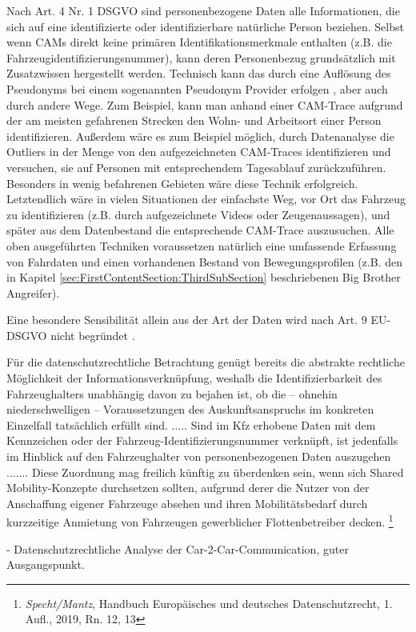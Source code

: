 Nach Art. 4 Nr. 1 DSGVO sind personenbezogene Daten alle Informationen, die sich auf eine identifizierte oder identifizierbare natürliche Person beziehen. Selbst wenn CAMs direkt keine primären Identifikationsmerkmale enthalten (z.B. die Fahrzeugidentifizierungsnummer), kann deren Personenbezug grundsätzlich mit Zusatzwissen hergestellt werden. Technisch kann das durch eine Auflösung des Pseudonyms bei einem sogenannten Pseudonym Provider erfolgen \cite{Kiometzis2017}, aber auch durch andere Wege. Zum Beispiel, kann man anhand einer CAM-Trace aufgrund der am meisten gefahrenen Strecken den Wohn- und Arbeitsort einer Person identifizieren. Außerdem wäre es zum Beispiel möglich, durch Datenanalyse die Outliers in der Menge von den aufgezeichneten CAM-Traces identifizieren und versuchen, sie auf Personen mit entsprechendem Tagesablauf zurückzuführen. Besonders in wenig befahrenen Gebieten wäre diese Technik erfolgreich. Letztendlich wäre in vielen Situationen der einfachste Weg, vor Ort das Fahrzeug zu identifizieren (z.B. durch aufgezeichnete Videos oder Zeugenaussagen), und später aus dem Datenbestand die entsprechende CAM-Trace auszusuchen. Alle oben ausgeführten Techniken voraussetzen natürlich eine umfassende Erfassung von Fahrdaten und einen vorhandenen Bestand von Bewegungsprofilen (z.B. den in Kapitel \ref{sec:FirstContentSection:ThirdSubSection} beschriebenen Big Brother Angreifer).

Eine besondere Sensibilität allein aus der Art der Daten wird nach Art. 9 EU-DSGVO nicht begründet \cite{Weichert2016}.

Für die datenschutzrechtliche Betrachtung genügt bereits die abstrakte rechtliche Möglichkeit der Informationsverknüpfung, weshalb die Identifizierbarkeit des Fahrzeughalters unabhängig davon zu bejahen ist, ob die – ohnehin niederschwelligen – Voraussetzungen des Auskunftsanspruchs im konkreten Einzelfall tatsächlich erfüllt sind. ..... Sind im Kfz erhobene Daten mit dem Kennzeichen oder der Fahrzeug-Identifizierungsnummer verknüpft, ist jedenfalls im Hinblick auf den Fahrzeughalter von personenbezogenen Daten auszugehen ....... Diese Zuordnung mag freilich künftig zu überdenken sein, wenn sich Shared Mobility-Konzepte durchsetzen sollten, aufgrund derer die Nutzer von der Anschaffung eigener Fahrzeuge absehen und ihren Mobilitätsbedarf durch kurzzeitige Anmietung von Fahrzeugen gewerblicher Flottenbetreiber decken. \footnote{\emph{Specht/Mantz}, Handbuch Europäisches und deutsches Datenschutzrecht, 1. Aufl.,  2019, Rn. 12, 13}

\cite{Weichert2016} - Datenschutzrechtliche Analyse der Car-2-Car-Communication, guter Ausgangspunkt.

